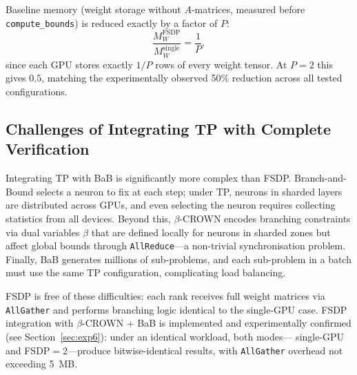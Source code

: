 Baseline memory (weight storage without $A$-matrices, measured before
\texttt{compute\_bounds}) is reduced exactly by a factor of $P$:
$$\frac{M_W^{\text{FSDP}}}{M_W^{\text{single}}} = \frac{1}{P},$$
since each GPU stores exactly $1/P$ rows of every weight tensor.
At $P = 2$ this gives $0.5$, matching the experimentally observed 50\%
reduction across all tested configurations.

\subsection{Challenges of Integrating TP with Complete Verification}

Integrating TP with BaB is significantly more complex than FSDP. Branch-and-Bound
selects a neuron to fix at each step; under TP, neurons in sharded layers are
distributed across GPUs, and even selecting the neuron requires collecting
statistics from all devices. Beyond this, $\beta$-CROWN encodes branching
constraints via dual variables $\beta$ that are defined locally for neurons in
sharded zones but affect global bounds through \texttt{AllReduce}---a non-trivial
synchronisation problem. Finally, BaB generates millions of sub-problems, and
each sub-problem in a batch must use the same TP configuration, complicating
load balancing.

FSDP is free of these difficulties: each rank receives full weight matrices via
\texttt{AllGather} and performs branching logic identical to the single-GPU case.
FSDP integration with $\beta$-CROWN + BaB is implemented and experimentally
confirmed (see Section~\ref{sec:exp6}): under an identical workload, both modes---
single-GPU and FSDP$=$2---produce bitwise-identical results, with \texttt{AllGather}
overhead not exceeding 5~MB.
